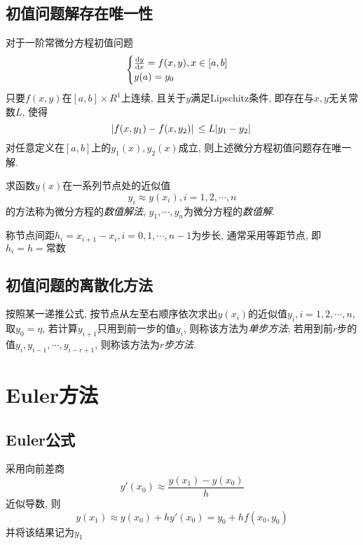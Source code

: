 \subsection{初值问题解存在唯一性}

对于一阶常微分方程初值问题
\begin{equation*}
    \begin{cases}
        \dv{y}{x}=f(x,y), x\in[a,b]\\
        y(a)=y_0
    \end{cases}
\end{equation*}
只要$f(x,y)$在$[a,b]\times R^1$上连续, 且关于$y$满足Lipschitz条件, 即存在与$x,y$无关常数$L$, 使得
\begin{equation*}
    \abs*{f(x,y_1)-f(x,y_2)}\le L\abs*{y_1-y_2}
\end{equation*}
对任意定义在$[a,b]$上的$y_1(x),y_2(x)$成立, 则上述微分方程初值问题存在唯一解.

求函数$y(x)$在一系列节点处的近似值
\begin{equation*}
    y_i\approx y(x_i), i=1,2,\cdots,n
\end{equation*}
的方法称为微分方程的\emph{数值解法}, $y_1,\cdots,y_n$为微分方程的\emph{数值解}.

称节点间距$h_i=x_{i+1}-x_i, i=0,1,\cdots,n-1$为步长, 通常采用等距节点, 即$h_i=h=\text{常数}$

\subsection{初值问题的离散化方法}

按照某一递推公式, 按节点从左至右顺序依次求出$y(x_i)$的近似值$y_i,i=1,2,\cdots,n$, 取$y_0=\eta$, 若计算$y_{i+1}$只用到前一步的值$y_i$, 则称该方法为\emph{单步方法}; 若用到前$r$步的值$y_i,y_{i-1},\cdots,y_{i-r+1}$, 则称该方法为\emph{$r$步方法}.

\section{Euler方法}

\subsection{Euler公式}

采用向前差商
\begin{equation*}
    y'(x_0)\approx\frac{y(x_1)-y(x_0)}{h}
\end{equation*}
近似导数, 则
\begin{equation*}
    y(x_1)\approx y(x_0)+hy'(x_0)=y_0+hf(x_0,y_0)
\end{equation*}
并将该结果记为$y_1$

